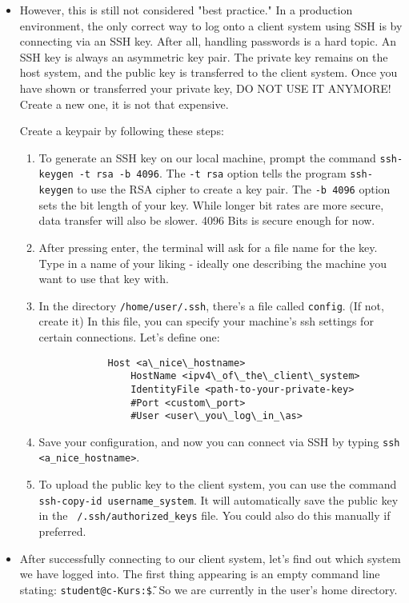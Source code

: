 \documentclass{dcbl/challenge}
\begin{document}
\begin{aufgabe}
\begin{itemize}
    \item However, this is still not considered "best practice." In a production environment, the only correct way to log onto a client system using SSH is by connecting via an SSH key. After all, handling passwords is a hard topic. An SSH key is always an asymmetric key pair. The private key remains on the host system, and the public key is transferred to the client system. Once you have shown or transferred your private key, DO NOT USE IT ANYMORE! Create a new one, it is not that expensive.
    
    Create a keypair by following these steps:
    \begin{enumerate}
        \item To generate an SSH key on our local machine, prompt the command \texttt{ssh-keygen -t rsa -b 4096}. The \texttt{-t rsa} option tells the program \texttt{ssh-keygen} to use the RSA cipher to create a key pair. The \texttt{-b 4096} option sets the bit length of your key. While longer bit rates are more secure, data transfer will also be slower. 4096 Bits is secure enough for now.
        \item After pressing enter, the terminal will ask for a file name for the key. Type in a name of your liking - ideally one describing the machine you want to use that key with.
        \item In the directory \texttt{/home/user/.ssh}, there's a file called \texttt{config}. (If not, create it) In this file, you can specify your machine's ssh settings for certain connections. Let's define one:
        \begin{lstlisting}
            Host <a\_nice\_hostname>
                HostName <ipv4\_of\_the\_client\_system>
                IdentityFile <path-to-your-private-key>
                #Port <custom\_port>
                #User <user\_you\_log\_in_\as>
        \end{lstlisting}
        \item Save your configuration, and now you can connect via SSH by typing \texttt{ssh <a\_nice\_hostname>}.
        \item To upload the public key to the client system, you can use the command \texttt{ssh-copy-id username\@remote\_system}. 
        It will automatically save the public key in the \texttt{~/.ssh/authorized\_keys} file. 
        You could also do this manually if preferred.
    \end{enumerate}

    \item After successfully connecting to our client system, let's find out which system we have logged into. The first thing appearing is an empty command line stating: \texttt{student@c-Kurs:\~\$}. So we are currently in the user's home directory.
    

\end{itemize}
\end{aufgabe}
\end{document}
